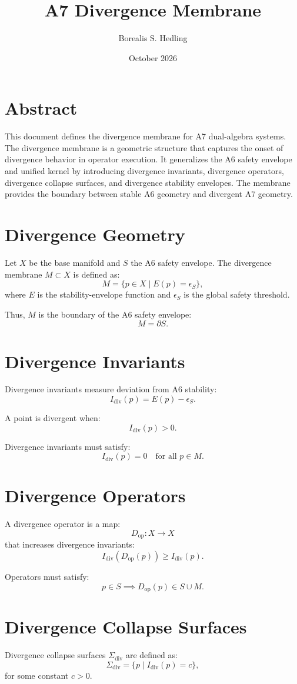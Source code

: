 \documentclass[11pt]{article}
\title{A7 Divergence Membrane}
\author{Borealis S. Hedling}
\date{October 2026}
\begin{document}
\maketitle

\section*{Abstract}
This document defines the divergence membrane for A7 dual-algebra systems. The
divergence membrane is a geometric structure that captures the onset of
divergence behavior in operator execution. It generalizes the A6 safety envelope
and unified kernel by introducing divergence invariants, divergence operators,
divergence collapse surfaces, and divergence stability envelopes. The membrane
provides the boundary between stable A6 geometry and divergent A7 geometry.

\section{Divergence Geometry}
Let $X$ be the base manifold and $S$ the A6 safety envelope. The divergence
membrane $M \subset X$ is defined as:
\[
M = \{ p \in X \mid E(p) = \epsilon_S \},
\]
where $E$ is the stability-envelope function and $\epsilon_S$ is the global
safety threshold.

Thus, $M$ is the boundary of the A6 safety envelope:
\[
M = \partial S.
\]

\section{Divergence Invariants}
Divergence invariants measure deviation from A6 stability:
\[
I_{\text{div}}(p) = E(p) - \epsilon_S.
\]

A point is divergent when:
\[
I_{\text{div}}(p) > 0.
\]

Divergence invariants must satisfy:
\[
I_{\text{div}}(p) = 0 \quad \text{for all } p \in M.
\]

\section{Divergence Operators}
A divergence operator is a map:
\[
D_{\text{op}} : X \to X
\]
that increases divergence invariants:
\[
I_{\text{div}}(D_{\text{op}}(p)) \geq I_{\text{div}}(p).
\]

Operators must satisfy:
\[
p \in S \implies D_{\text{op}}(p) \in S \cup M.
\]

\section{Divergence Collapse Surfaces}
Divergence collapse surfaces $\Sigma_{\text{div}}$ are defined as:
\[
\Sigma_{\text{div}} = \{ p \mid I_{\text{div}}(p) = c \},
\]
for some constant $c > 0$.
\end{document}
